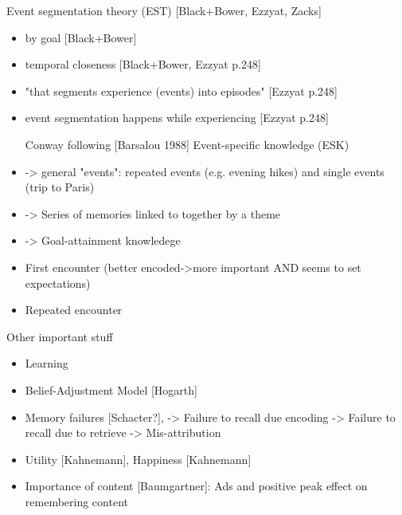 Event segmentation theory (EST) [Black+Bower, Ezzyat, Zacks]
\begin{itemize}
\item by goal [Black+Bower]
\item temporal closeness [Black+Bower, Ezzyat p.248]
\item "that segments experience (events) into episodes" [Ezzyat p.248]
\item event segmentation happens while experiencing [Ezzyat p.248]

\item [Conway] following [Barsalou 1988] Event-specific knowledge (ESK)
\item -> general "events": repeated events (e.g. evening hikes) and single events (trip to Paris)
\item -> Series of memories linked to together by a theme
\item -> Goal-attainment knowledege
\item First encounter (better encoded->more important AND seems to set expectations)
\item Repeated encounter
\end{itemize}

Other important stuff  
\begin{itemize}
\item Learning
\item Belief-Adjustment Model [Hogarth]
\item Memory failures [Schacter?], -> Failure to recall due encoding  -> Failure to recall due to retrieve -> Mis-attribution
\item Utility [Kahnemann],  Happiness [Kahnemann]

\item Importance of content [Baumgartner]: Ads and positive peak effect on remembering content
\end{itemize}